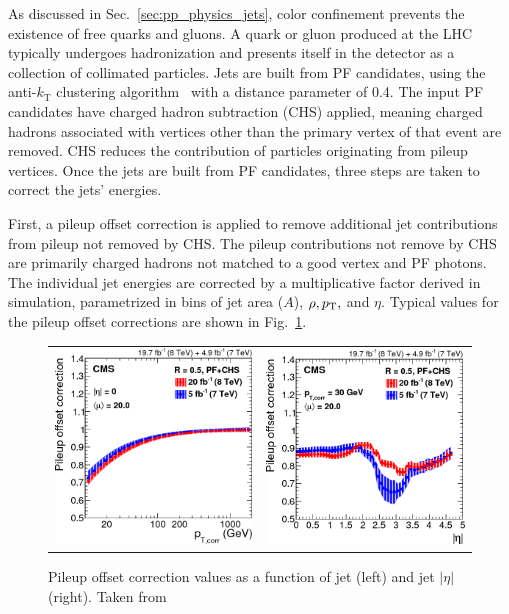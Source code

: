 As discussed in Sec.~\ref{sec:pp_physics_jets}, color confinement prevents the existence of free quarks and gluons.
A quark or gluon produced at the LHC typically undergoes hadronization and presents itself in the detector as a collection of collimated particles.
Jets are built from PF candidates, using the anti-$k_{\text{T}}$ clustering algorithm~\cite{Cacciari:2008gp,Cacciari:2011ma} with a distance parameter of 0.4.
The input PF candidates have charged hadron subtraction (CHS) applied, meaning charged hadrons associated with vertices other than the primary vertex of that event are removed.
CHS reduces the contribution of particles originating from pileup vertices.
Once the jets are built from PF candidates, three steps are taken to correct the jets' energies.

First, a pileup offset correction is applied to remove additional jet contributions from pileup not removed by CHS.
The pileup contributions not remove by CHS are primarily charged hadrons not matched to a good vertex and PF photons.
The individual jet energies are corrected by a multiplicative factor derived in simulation, parametrized in bins of jet area ($A$), $\rho, p_{\mathrm{T}},$ and $\eta$.
Typical values for the pileup offset corrections are shown in Fig.~\ref{fig:evt_jet_pu_corrections}.
\begin{figure} [h!]
    \centering
    \begin{tabular}{c c}
        \includegraphics[width=0.48\linewidth]{figures/event_reconstruction_and_selection/jetmet8Tev_Figure_009-c.png} &
        \includegraphics[width=0.48\linewidth]{figures/event_reconstruction_and_selection/jetmet8Tev_Figure_009-d.png}
    \end{tabular}
    \caption{Pileup offset correction values as a function of jet \pT (left) and jet $|\eta|$ (right). Taken from~\cite{Khachatryan_2017_jets}}
    \label{fig:evt_jet_pu_corrections}
\end{figure}

